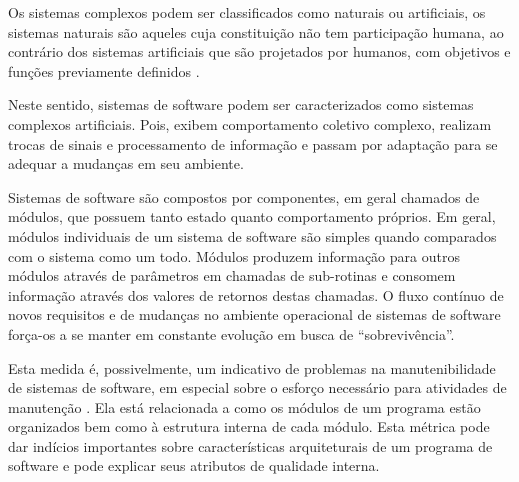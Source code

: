 Os sistemas complexos podem ser classificados como naturais ou artificiais, os
sistemas naturais são aqueles cuja constituição não tem participação humana, ao
contrário dos sistemas artificiais que são projetados por humanos, com
objetivos e funções previamente definidos \cite{Simon1996}.

Neste sentido, sistemas de software podem ser caracterizados como sistemas
complexos artificiais. Pois, exibem comportamento coletivo complexo, realizam
trocas de sinais e processamento de informação e passam por adaptação para se
adequar a mudanças em seu ambiente.

Sistemas de software são compostos por componentes, em geral chamados de
módulos, que possuem tanto estado quanto comportamento próprios. Em geral,
módulos individuais de um sistema de software são simples quando comparados com
o sistema como um todo. Módulos produzem informação para outros módulos
através de parâmetros em chamadas de sub-rotinas e consomem informação através
dos valores de retornos destas chamadas. O fluxo contínuo de novos requisitos e
de mudanças no ambiente operacional de sistemas de software força-os a se
manter em constante evolução em busca de “sobrevivência”.

Esta medida é, possivelmente, um indicativo de problemas na manutenibilidade de
sistemas de software, em especial sobre o esforço necessário para atividades de
manutenção \cite{Terceiro2012}. Ela está relacionada a como os módulos de um
programa estão organizados bem como à estrutura interna de cada módulo. Esta
métrica pode dar indícios importantes sobre características arquiteturais de um
programa de software e pode explicar seus atributos de qualidade interna.

